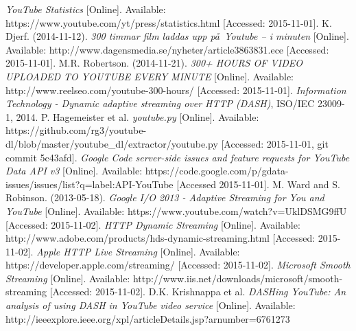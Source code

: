 \begin{thebibliography}{5}
    \footnotesize
        \textit{YouTube Statistics}
        [Online].
        Available:
        https://www.youtube.com/yt/press/statistics.html
        [Accessed: 2015-11-01].
        K. Djerf.
        (2014-11-12).
        \textit{300 timmar film laddas upp p\aa\  Youtube – i minuten}
        [Online].
        Available:
        http://www.dagensmedia.se/nyheter/article3863831.ece
        [Accessed: 2015-11-01].
        M.R. Robertson.
        (2014-11-21).
        \textit{300+ HOURS OF VIDEO UPLOADED TO YOUTUBE EVERY MINUTE}
        [Online].
        Available:
        http://www.reelseo.com/youtube-300-hours/
        [Accessed: 2015-11-01].
        \textit{Information Technology - Dynamic adaptive streaming over HTTP (DASH)},
        ISO/IEC 23009-1, 2014.
        P. Hagemeister et al.
        \textit{youtube.py}
        [Online].
        Available:
        https://github.com/rg3/youtube-dl/blob/master/youtube\_dl/extractor/youtube.py
        [Accessed: 2015-11-01, git commit 5c43afd].
        \textit{Google Code server-side issues and feature requests for YouTube Data API v3}
        [Online].
        Available:
        https://code.google.com/p/gdata-issues/issues/list?q=label:API-YouTube
        [Accessed 2015-11-01].
        M. Ward and S. Robinson.
        (2013-05-18).
        \textit{Google I/O 2013 - Adaptive Streaming for You and YouTube}
        [Online].
        Available:
        https://www.youtube.com/watch?v=UklDSMG9ffU
        [Accessed: 2015-11-02].
        \textit{HTTP Dynamic Streaming}
        [Online].
        Available:
        http://www.adobe.com/products/hds-dynamic-streaming.html
        [Accessed: 2015-11-02].
        \textit{Apple HTTP Live Streaming}
        [Online].
        Available:
        https://developer.apple.com/streaming/
        [Accessed: 2015-11-02].
        \textit{Microsoft Smooth Streaming}
        [Online].
        Available:
        http://www.iis.net/downloads/microsoft/smooth-streaming
        [Accessed: 2015-11-02].
        D.K. Krishnappa et al.
        \textit{DASHing YouTube: An analysis of using DASH in YouTube video service}
        [Online].
        Available:
        http://ieeexplore.ieee.org/xpl/articleDetails.jsp?arnumber=6761273

\end{thebibliography}
